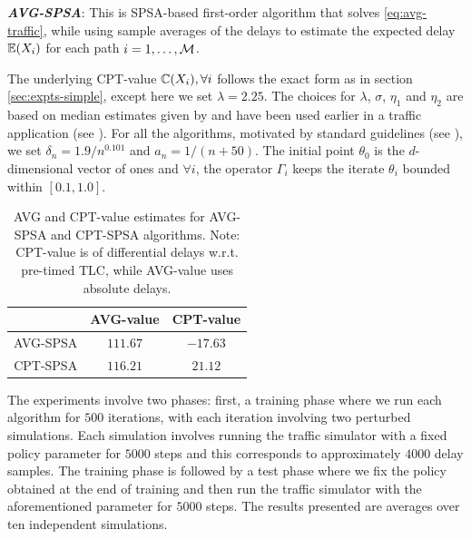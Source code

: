 {\bf\em AVG-SPSA}: This is SPSA-based first-order algorithm that solves \eqref{eq:avg-traffic}, while using sample averages of the delays to estimate the expected delay $\mathbb{E}(X_i)$ for each path $i=1,\ldots,\mathcal{M}$. 

The underlying CPT-value $\mathbb{C}(X_i), \forall i$ follows the exact form as in section \ref{sec:expts-simple}, except here we set $\lambda = 2.25$.
The choices for $\lambda$, $\sigma$, $\eta_1$ and $\eta_2$ are based on median estimates given by \cite{tversky1992advances} and have been used earlier in a traffic application (see \cite{gao2010adaptive}).
For all the algorithms,
 motivated by standard guidelines (see \cite{spall2005introduction}),
 we set $\delta_n = 1.9/n^{0.101}$ and $a_n = 1/(n+50)$. The initial point $\theta_0$ is the $d$-dimensional vector of ones and $\forall i$, the operator $\Gamma_i$ keeps the iterate $\theta_i$ bounded within $[0.1, 1.0]$.

\begin{table}
 \centering
  \caption{AVG and CPT-value estimates for AVG-SPSA and CPT-SPSA algorithms. Note: CPT-value is of differential delays w.r.t. pre-timed TLC, while 
  AVG-value uses absolute delays.}
  \label{tab:cpt-results}
 \begin{tabular}{|c|c|c|}
  \toprule 
   & \textbf{AVG-value}& \textbf{CPT-value }\\\midrule
   AVG-SPSA & $\bm{111.67}$ & $-17.63$ \\\midrule
   CPT-SPSA & $116.21$ & $\bm{21.12}$\\
   \bottomrule
  \end{tabular}
%   
%   
\end{table}


 
The experiments involve two phases:
first, a training phase where we run each algorithm for $500$ iterations, with each iteration involving two perturbed simulations. Each simulation involves running the traffic simulator with a fixed policy parameter for $5000$ steps and this corresponds to approximately $4000$ delay samples. The training phase is followed by a test phase where we fix the policy obtained at the end of training and then run the traffic simulator with the aforementioned parameter for $5000$ steps. The results presented are averages over ten independent simulations.


